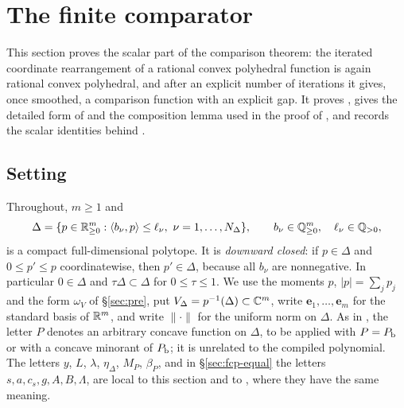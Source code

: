 \section{The finite comparator}\label{sec:fcp}

This section proves the scalar part of the comparison theorem: the iterated coordinate rearrangement of a rational
convex polyhedral function is again rational convex polyhedral, and after an explicit number of iterations it gives,
once smoothed, a comparison function with an explicit gap. It proves , gives the
detailed form of  and the composition lemma used in the proof of
, and records the scalar identities behind .

\subsection{Setting}\label{sec:fcp-setting}

Throughout, $m\ge1$ and
\[
 \Delta=\{p\in\mathbb{R}^m_{\ge0}:\langle b_\nu,p\rangle\le\ell_\nu,\ \nu=1,\dots,N_\Delta\},\qquad
 b_\nu\in\mathbb{Q}^m_{\ge0},\quad\ell_\nu\in\mathbb{Q}_{>0},
\]
is a compact full-dimensional polytope. It is \emph{downward closed}: if $p\in\Delta$ and $0\le p'\le p$ coordinatewise,
then $p'\in\Delta$, because all $b_\nu$ are nonnegative. In particular $0\in\Delta$ and $\tau\Delta\subset\Delta$ for
$0\le\tau\le1$. We use the moments $p$, $|p|=\sum_jp_j$ and the form $\omega_V$ of \S\ref{sec:pre}, put
$V_\Delta=p^{-1}(\Delta)\subset\mathbb{C}^m$, write $\mathbf e_1,\dots,\mathbf e_m$ for the standard basis of $\mathbb{R}^m$, and
write $\|\cdot\|$ for the uniform norm on $\Delta$. As in , the letter $P$ denotes an arbitrary concave
function on $\Delta$, to be applied with $P=P_{\mathrm b}$ or with a concave minorant of $P_{\mathrm b}$; it is unrelated to the compiled
polynomial. The letters $y$, $L$, $\lambda$, $\eta_\Delta$, $M_P$, $\beta_P$, and in \S\ref{sec:fcp-equal} the
letters $s,a,c_s,g,A,B,\Lambda$, are local to this section and to , where they have the same meaning.

